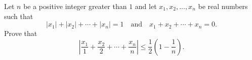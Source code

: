 Let $n$ be a positive integer greater than $1$ and let $x_1,x_2,\ldots,x_n$ be real numbers such that \[|x_1|+|x_2|+\cdots+|x_n|=1\quad\text{and}\quad x_1+x_2+\cdots+x_n=0.\] Prove that \[\left|\frac{x_1}{1}+\frac{x_2}{2}+\cdots+\frac{x_n}{n}\right|\leq\frac{1}{2}\left(1-\frac{1}{n}\right).\]
